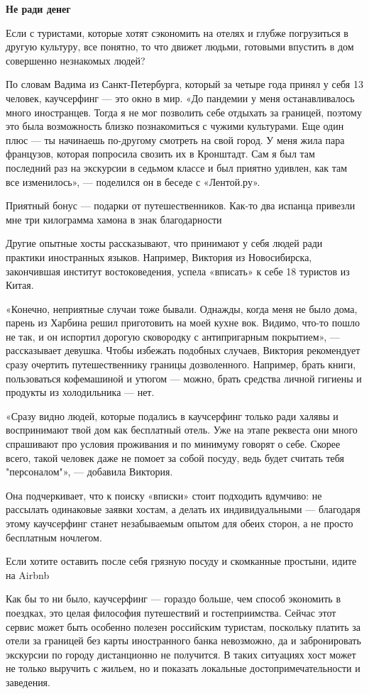 \textbf{Не ради денег}

Если с туристами, которые хотят сэкономить на отелях и глубже погрузиться в другую культуру, все понятно, то что движет людьми, готовыми впустить в дом совершенно незнакомых людей?

По словам Вадима из Санкт-Петербурга, который за четыре года принял у себя 13 человек, каучсерфинг — это окно в мир. «До пандемии у меня останавливалось много иностранцев. Тогда я не мог позволить себе отдыхать за границей, поэтому это была возможность близко познакомиться с чужими культурами. Еще один плюс — ты начинаешь по-другому смотреть на свой город. У меня жила пара французов, которая попросила свозить их в Кронштадт. Сам я был там последний раз на экскурсии в седьмом классе и был приятно удивлен, как там все изменилось», — поделился он в беседе с «Лентой.ру».

\begin{fancyquotes}
    Приятный бонус — подарки от путешественников. Как-то два испанца привезли мне три килограмма хамона в знак благодарности
\end{fancyquotes}

Другие опытные хосты рассказывают, что принимают у себя людей ради практики иностранных языков. Например, Виктория из Новосибирска, закончившая институт востоковедения, успела «вписать» к себе 18 туристов из Китая.

«Конечно, неприятные случаи тоже бывали. Однажды, когда меня не было дома, парень из Харбина решил приготовить на моей кухне вок. Видимо, что-то пошло не так, и он испортил дорогую сковородку с антипригарным покрытием», — рассказывает девушка. Чтобы избежать подобных случаев, Виктория рекомендует сразу очертить путешественнику границы дозволенного. Например, брать книги, пользоваться кофемашиной и утюгом — можно, брать средства личной гигиены и продукты из холодильника — нет.

«Сразу видно людей, которые подались в каучсерфинг только ради халявы и воспринимают твой дом как бесплатный отель. Уже на этапе реквеста они много спрашивают про условия проживания и по минимуму говорят о себе. Скорее всего, такой человек даже не помоет за собой посуду, ведь будет считать тебя "персоналом"», — добавила Виктория.

Она подчеркивает, что к поиску «вписки» стоит подходить вдумчиво: не рассылать одинаковые заявки хостам, а делать их индивидуальными — благодаря этому каучсерфинг станет незабываемым опытом для обеих сторон, а не просто бесплатным ночлегом.

\begin{center}
    \Large
    Если хотите оставить после себя грязную посуду и скомканные простыни, идите на Airbnb
\end{center}

Как бы то ни было, каучсерфинг — гораздо больше, чем способ экономить в поездках, это целая философия путешествий и гостеприимства. Сейчас этот сервис может быть особенно полезен российским туристам, поскольку платить за отели за границей без карты иностранного банка невозможно, да и забронировать экскурсии по городу дистанционно не получится. В таких ситуациях хост может не только выручить с жильем, но и показать локальные достопримечательности и заведения.